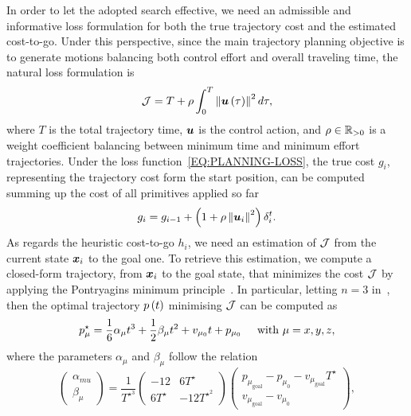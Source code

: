 In order to let the adopted search effective, we need an admissible and informative loss formulation for both the true trajectory cost
and the estimated cost-to-go. Under this perspective, since the main trajectory planning objective is to generate motions balancing both
control effort and overall traveling time, the natural loss formulation is
\begin{equation}
	\label{EQ:PLANNING-LOSS}
	\mathcal{J} = T + \rho \int_0^T \left \lVert {\boldsymbol{u} \left(\tau \right)} \right \rVert^2 d \tau,
\end{equation}
where $T$ is the total trajectory time, $\boldsymbol{u}$ is the control action, and $\rho \in \mathbb{R}_{>0}$ is a weight coefficient balancing between
minimum time and minimum effort trajectories.
Under the loss function~\eqref{EQ:PLANNING-LOSS}, the true cost $g_i$, representing the trajectory cost form the start position, can be
computed summing up the cost of all primitives applied so far
\begin{equation*}
	g_i = g_{i-1} + \left( 1 + \rho\left \lVert {\boldsymbol{u}_i} \right \rVert^2 \right) \delta_i^t.
\end{equation*}
As regards the heuristic cost-to-go $h_i$, we need an estimation of $\mathcal{J}$ from the current state $\boldsymbol{x}_i$ to the goal one.
To retrieve this estimation, we compute a closed-form trajectory, from $\boldsymbol{x}_i$ to the goal state, that minimizes the cost $\mathcal{J}$
by applying the Pontryagins minimum principle~\cite{mueller2015computationally}.
In particular, letting $n = 3$ in~, then the optimal trajectory $p\left( t \right)$ minimising $\mathcal{J}$ can
be computed as
\begin{equation}
	\label{EQ:OPTIMAL-TRAJECTORY}
	p^{\star}_{\mu} = \frac{1}{6}\alpha_{\mu}t^3 + \frac{1}{2}\beta_{\mu}t^2 + v_{\mu_0}t + p_{\mu_0} \hspace*{0.5cm} \text{with } \mu = x,y,z,
\end{equation}
where the parameters $\alpha_{\mu}$ and $\beta_{\mu}$ follow the relation
\begin{equation*}
	\begin{pmatrix}
		\alpha_{mu} \\ \beta_{\mu}
	\end{pmatrix} = \frac{1}{T^{{\star}^3}}
	\begin{pmatrix}
		-12 & 6T^{\star} \\ 6T^{\star} & -12T^{{\star}^2}
	\end{pmatrix}
	\begin{pmatrix}
		p_{\mu_{\text{goal}}} - p_{\mu_0} - v_{\mu_{\text{goal}}}T^{\star} \\
		v_{\mu_{\text{goal}}} - v_{\mu_{0}}
	\end{pmatrix},
\end{equation*}
